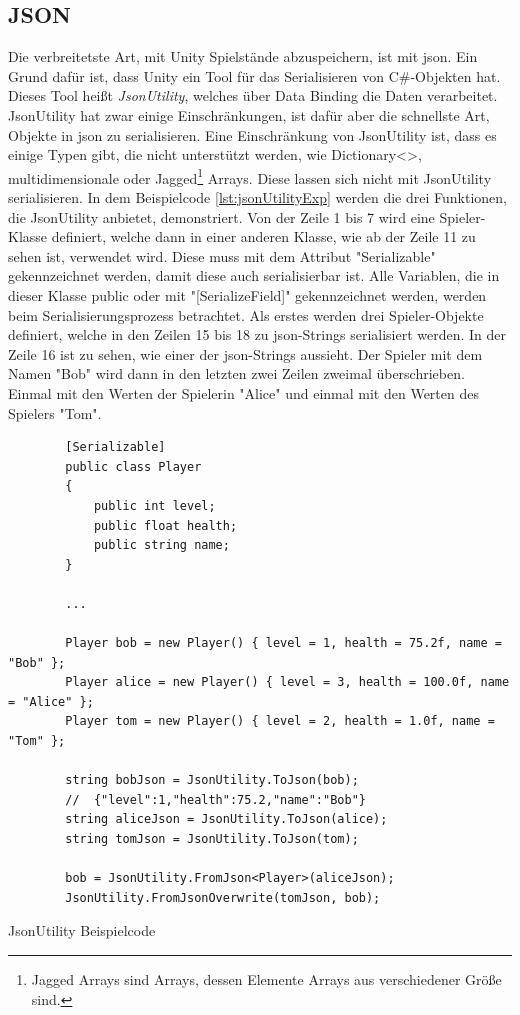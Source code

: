 \subsection{JSON}
Die verbreitetste Art, mit Unity Spielstände abzuspeichern, ist mit \ac{json}. Ein Grund dafür ist, dass Unity ein Tool für das Serialisieren von C\#-Objekten hat. Dieses Tool heißt \textit{JsonUtility}, welches über Data Binding die Daten verarbeitet. JsonUtility hat zwar einige Einschränkungen, ist dafür aber die schnellste Art, Objekte in \ac{json} zu serialisieren. Eine Einschränkung von JsonUtility ist, dass es einige Typen gibt, die nicht unterstützt werden, wie Dictionary<>, multidimensionale oder Jagged\footnote{Jagged Arrays sind Arrays, dessen Elemente Arrays aus verschiedener Größe sind.\cite{microsoftVerzweigteArrays}} Arrays. Diese lassen sich nicht mit JsonUtility serialisieren. In dem Beispielcode \ref{lst:jsonUtilityExp} werden die drei Funktionen, die JsonUtility anbietet, demonstriert. Von der Zeile 1 bis 7 wird eine Spieler-Klasse definiert, welche dann in einer anderen Klasse, wie ab der Zeile 11 zu sehen ist, verwendet wird. Diese muss mit dem Attribut "Serializable" gekennzeichnet werden, damit diese auch serialisierbar ist. Alle Variablen, die in dieser Klasse public oder mit "[SerializeField]" gekennzeichnet werden, werden beim Serialisierungsprozess betrachtet. Als erstes werden drei Spieler-Objekte definiert, welche in den Zeilen 15 bis 18 zu \ac{json}-Strings serialisiert werden. In der Zeile 16 ist zu sehen, wie einer der \ac{json}-Strings aussieht. Der Spieler mit dem Namen "Bob" wird dann in den letzten zwei Zeilen zweimal überschrieben. Einmal mit den Werten der Spielerin "Alice" und einmal mit den Werten des Spielers "Tom".\cite{unityJsonUtility}\cite{unitySerializationRules} 

\begin{listing}[htp]
    \begin{verbatim} 
        [Serializable]
        public class Player
        {
            public int level;
            public float health;
            public string name;
        }

        ...
        
        Player bob = new Player() { level = 1, health = 75.2f, name = "Bob" };
        Player alice = new Player() { level = 3, health = 100.0f, name = "Alice" };
        Player tom = new Player() { level = 2, health = 1.0f, name = "Tom" };

        string bobJson = JsonUtility.ToJson(bob);
        //  {"level":1,"health":75.2,"name":"Bob"}
        string aliceJson = JsonUtility.ToJson(alice);
        string tomJson = JsonUtility.ToJson(tom);

        bob = JsonUtility.FromJson<Player>(aliceJson);
        JsonUtility.FromJsonOverwrite(tomJson, bob);
    \end{verbatim}
    \caption{JsonUtility Beispielcode}
    \label{lst:jsonUtilityExp}
\end{listing}

